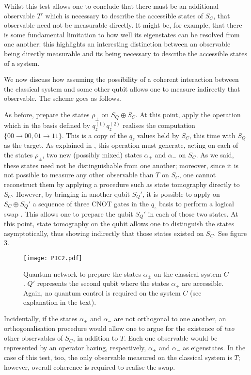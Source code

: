 \documentclass[prl,twocolumn,showpacs,preprintnumbers,amsmath,amssymb]{revtex4}
\begin{document}
Whilst this test allows one to conclude that there must be an additional observable $T'$ which is necessary to describe the accessible states of $S_C$, that observable need not be measurable directly. It might be, for example, that there is some fundamental limitation to how well its eigenstates can be resolved from one another: this highlights an interesting distinction between an observable being directly measurable and its being necessary to describe the accessible states of a system. 

We now discuss how assuming the possibility of a coherent interaction between the classical system and some other qubit allows one to measure indirectly that observable. The scheme goes as follows. 

As before, prepare the states $\rho_{\pm}$ on $S_Q\oplus S_C$. At this point, apply the operation which in the basis defined by $q_z^{(1)}q_z^{(2)}$ realises the computation $\{00\rightarrow 00, 01\rightarrow 11\}$. This is a copy of the $q_z$ values held by $S_C$, this time with $S_Q$ as the target. As explained in \cite{MAVE}, this operation must generate, acting on each of the states $\rho_{\pm}$, two new (possibly mixed) states ${\alpha_+}$ and ${\alpha_-}$ on $S_C$.  As we said, these states need not be distinguishable from one another; moreover, since it is not possible to measure any other observable than $T$ on $S_C$, one cannot reconstruct them by applying a procedure such as state tomography directly to $S_C$. However, by bringing in another qubit $S_Q'$, it is possible to apply on $S_C\oplus S_Q'$ a sequence of three CNOT gates in the $q_z$ basis to perform a logical swap \cite{NIE}. This allows one to prepare the qubit $S_Q'$ in each of those two states. At this point, state tomography on the qubit allows one to distinguish the states asymptotically, thus showing indirectly that those states existed on $S_C$. See figure 3. 



\begin{figure}[h]
	\centering
	\texttt{[image: PIC2.pdf]} 
	\caption{Quantum network to prepare the states $\alpha_{\pm}$ on the classical system $C$. $Q'$ represents the second qubit where the states $\alpha_{\pm}$ are accessible. Again, no quantum control is required on the system $C$ (see explanation in the text).}
\end{figure}

Incidentally, if the states ${\alpha_+}$ and ${\alpha_-}$ are not orthogonal to one another, an orthogonalisation procedure would allow one to argue for the existence of {\sl two} other observables of $S_C$, in addition to $T$. Each one observable would be represented by an operator having, respectively, ${\alpha_+}$ and ${\alpha_-}$ as eigenstates. In the case of this test, too, the only observable measured on the classical system is $T$; however, overall coherence is required to realise the swap.
\end{document}
